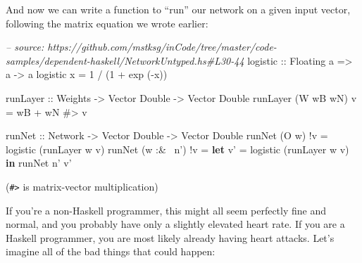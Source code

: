 \documentclass[]{article}
\newenvironment{Shaded}{\begin{snugshade}}{\end{snugshade}}
\newcommand{\CommentTok}[1]{\textcolor[rgb]{0.56,0.35,0.01}{\textit{#1}}}
\newcommand{\DataTypeTok}[1]{\textcolor[rgb]{0.13,0.29,0.53}{#1}}
\newcommand{\DecValTok}[1]{\textcolor[rgb]{0.00,0.00,0.81}{#1}}
\newcommand{\FunctionTok}[1]{\textcolor[rgb]{0.00,0.00,0.00}{#1}}
\newcommand{\KeywordTok}[1]{\textcolor[rgb]{0.13,0.29,0.53}{\textbf{#1}}}
\newcommand{\NormalTok}[1]{#1}
\newcommand{\OtherTok}[1]{\textcolor[rgb]{0.56,0.35,0.01}{#1}}
\begin{document}
And now we can write a function to ``run'' our network on a given input vector,
following the matrix equation we wrote earlier:

\begin{Shaded}
\begin{Highlighting}[]
\CommentTok{-- source: https://github.com/mstksg/inCode/tree/master/code-samples/dependent-haskell/NetworkUntyped.hs#L30-44}
\OtherTok{logistic ::} \DataTypeTok{Floating}\NormalTok{ a }\OtherTok{=>}\NormalTok{ a }\OtherTok{->}\NormalTok{ a}
\NormalTok{logistic x }\FunctionTok{=} \DecValTok{1} \FunctionTok{/}\NormalTok{ (}\DecValTok{1} \FunctionTok{+}\NormalTok{ exp (}\FunctionTok{-}\NormalTok{x))}

\OtherTok{runLayer ::} \DataTypeTok{Weights} \OtherTok{->} \DataTypeTok{Vector} \DataTypeTok{Double} \OtherTok{->} \DataTypeTok{Vector} \DataTypeTok{Double}
\NormalTok{runLayer (}\DataTypeTok{W}\NormalTok{ wB wN) v }\FunctionTok{=}\NormalTok{ wB }\FunctionTok{+}\NormalTok{ wN }\FunctionTok{#>}\NormalTok{ v}

\OtherTok{runNet ::} \DataTypeTok{Network} \OtherTok{->} \DataTypeTok{Vector} \DataTypeTok{Double} \OtherTok{->} \DataTypeTok{Vector} \DataTypeTok{Double}
\NormalTok{runNet (}\DataTypeTok{O}\NormalTok{ w)      }\FunctionTok{!}\NormalTok{v }\FunctionTok{=}\NormalTok{ logistic (runLayer w v)}
\NormalTok{runNet (w }\FunctionTok{:&~}\NormalTok{ n') }\FunctionTok{!}\NormalTok{v }\FunctionTok{=} \KeywordTok{let}\NormalTok{ v' }\FunctionTok{=}\NormalTok{ logistic (runLayer w v)}
                       \KeywordTok{in}\NormalTok{  runNet n' v'}
\end{Highlighting}
\end{Shaded}

(\texttt{\#\textgreater{}} is matrix-vector multiplication)

If you're a non-Haskell programmer, this might all seem perfectly fine and
normal, and you probably have only a slightly elevated heart rate. If you are a
Haskell programmer, you are most likely already having heart attacks. Let's
imagine all of the bad things that could happen:
\end{document}
